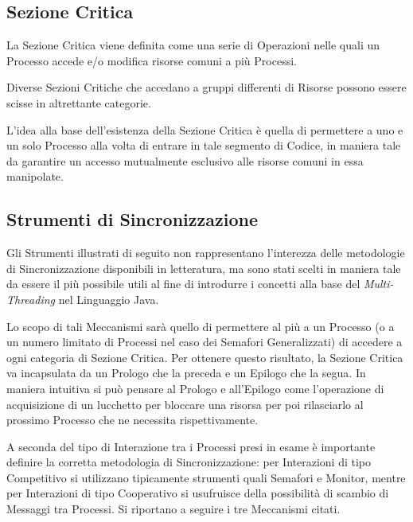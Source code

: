 \subsection{Sezione Critica}
La Sezione Critica viene definita come una serie di Operazioni nelle quali un Processo accede e/o modifica risorse comuni a più Processi. \par
Diverse Sezioni Critiche che accedano a gruppi differenti di Risorse possono essere scisse in altrettante categorie. \par
L'idea alla base dell'esistenza della Sezione Critica è quella di permettere a uno e un solo Processo alla volta di entrare in tale segmento di Codice, in maniera tale da garantire un accesso mutualmente esclusivo alle risorse comuni in essa manipolate.
\subsection{Strumenti di Sincronizzazione}
Gli Strumenti illustrati di seguito non rappresentano l'interezza delle metodologie di Sincronizzazione disponibili in letteratura, ma sono stati scelti in maniera tale da essere il più possibile utili al fine di introdurre i concetti alla base del \textit{Multi-Threading} nel Linguaggio Java. \par
Lo scopo di tali Meccanismi sarà quello di permettere al più a un Processo (o a un numero limitato di Processi nel caso dei Semafori Generalizzati) di accedere a ogni categoria di Sezione Critica. Per ottenere questo risultato, la Sezione Critica va incapsulata da un Prologo che la preceda e un Epilogo che la segua. In maniera intuitiva si può pensare al Prologo e all'Epilogo come l'operazione di acquisizione di un lucchetto per bloccare una risorsa per poi rilasciarlo al prossimo Processo che ne necessita rispettivamente. \par
A seconda del tipo di Interazione tra i Processi presi in esame è importante definire la corretta metodologia di Sincronizzazione: per Interazioni di tipo Competitivo si utilizzano tipicamente strumenti quali Semafori e Monitor, mentre per Interazioni di tipo Cooperativo si usufruisce della possibilità di scambio di Messaggi tra Processi. Si riportano a seguire i tre Meccanismi citati.
